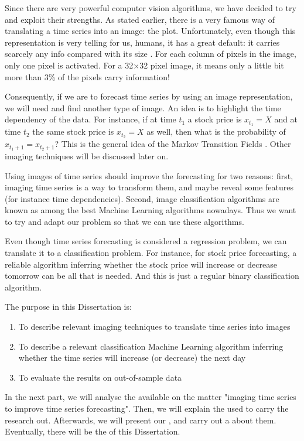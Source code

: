 \documentclass[11pt]{article}
\begin{document}
\begin{onehalfspace}
Since there are very powerful computer vision algorithms, we have decided to try and exploit their strengths. As stated earlier, there is a very famous way of translating a time series into an image: the plot. Unfortunately, even though this representation is very telling for us, humans, it has a great default: it carries scarcely any info compared with its size \cite{jastrzebska}. For each column of pixels in the image, only one pixel is activated. For a 32$\times$32 pixel image, it means only a little bit more than 3\% of the pixels carry information!

Consequently, if we are to forecast time series by using an image representation, we will need and find another type of image. An idea is to highlight the time dependency of the data. For instance, if at time $t_1$ a stock price is $x_{t_1} = X$ and at time $t_2$ the same stock price is $x_{t_2} = X$ as well, then what is the probability of $x_{t_1 + 1} = x_{t_2 + 1}$? This is the general idea of the Markov Transition Fields \cite{wang}. Other imaging techniques will be discussed later on.

Using images of time series should improve the forecasting for two reasons: first, imaging time series is a way to transform them, and maybe reveal some features (for instance time dependencies). Second, image classification algorithms are known as among the best Machine Learning algorithms nowadays. Thus we want to try and adapt our problem so that we can use these algorithms.

Even though time series forecasting is considered a regression problem, we can translate it to a classification problem. For instance, for stock price forecasting, a reliable algorithm inferring whether the stock price will increase or decrease tomorrow can be all that is needed. And this is just a regular binary classification algorithm. 

The purpose in this Dissertation is:

\begin{enumerate}
    \item To describe relevant imaging techniques to translate time series into images
    \item To describe a relevant classification Machine Learning algorithm inferring whether the time series will increase (or decrease) the next day
    \item To evaluate the results on out-of-sample data
\end{enumerate}

In the next part, we will analyse the  available on the matter "imaging time series to improve time series forecasting". Then, we will explain the  used to carry the research out. Afterwards, we will present our , and carry out a  about them. Eventually, there will be the  of this Dissertation.


\end{onehalfspace}
\end{document}
